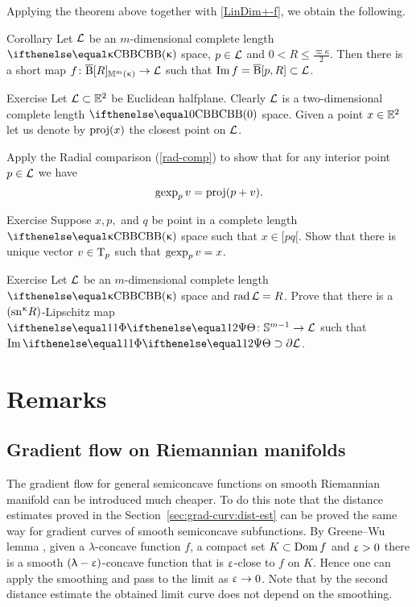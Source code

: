 Applying the theorem above together with \ref{LinDim+-f},
we obtain the following.

{\sloppy 
 
\begin{thm}{Corollary}\label{cor:short-map-to-ball}
Let $\mathcal{L}$ be an $m$-dimensional complete length $\Alex\kappa$ space, $p\in\spc{L}$ and $0<R\le\tfrac{\varpi\kappa}2$.
Then there is a short map 
$f\:\cBall[R]_{\Lob{m}{\kappa}}\to \spc{L}$
such that $\Im f= \cBall[p,R]\subset \spc{L}$.
\end{thm}

}





\begin{thm}{Exercise}\label{ex:gexp} 
Let $\spc{L}\subset\EE^2$ be Euclidean halfplane. 
Clearly $\mathcal{L}$ is a two-dimensional complete length $\Alex{0}$ space.
Given a point $x\in \EE^2$ let us denote by $\mathop{\rm proj}\nolimits(x)$ the closest point on $\mathcal{L}$. 

Apply the Radial comparison (\ref{rad-comp}) to show that for any interior point $p\in \spc{L}$ we have 
\[\mathop{\rm gexp}\nolimits_p v=\mathop{\rm proj}\nolimits(p+v).\]
\end{thm}

\begin{thm}{Exercise}\label{ex:inv-gexp}
Suppose $x,p,$ and $q$ be point in a complete length $\Alex\kappa$ space such that $x\in [pq[$.
Show that there is unique vector $v\in\T_p$ such that $\mathop{\rm gexp}\nolimits_p v=x$.
\end{thm}


{\sloppy 

\begin{thm}{Exercise}\label{ex:bry-cover}
Let $\mathcal{L}$ be an $m$-dimensional complete length $\Alex\kappa$ space and $\mathop{\rm rad}\nolimits\mathcal{L}=R$.
Prove that there is a $(\mathrm{sn}^{\upkappa} R)$-Lipschitz map $\map\:\mathbb{S}^{m-1}\to\spc{L}$ such that $\Im\map\supset\partial\spc{L}$.
\end{thm}

}

\section{Remarks}

\subsection*{Gradient flow on Riemannian manifolds}
The gradient flow for general semiconcave functions 
on smooth Riemannian manifold  can be introduced much cheaper.
To do this note that the distance estimates proved in the Section~\ref{sec:grad-curv:dist-est}
can be proved the same way for gradient curves of smooth semiconcave subfunctions.
By Greene--Wu lemma \cite{greene-wu}, 
given 
a $\lambda$-concave function $f$, 
a compact set $K\subset \Dom f$
and $\upvarepsilon>0$
there is a smooth $(\uplambda-\upvarepsilon)$-concave function that is 
$\upvarepsilon$-close to $f$ on $K$.
Hence one can apply the smoothing and pass to the limit as $\eps\to0$.
Note that by the second distance estimate the obtained limit curve does not depend on the smoothing.


